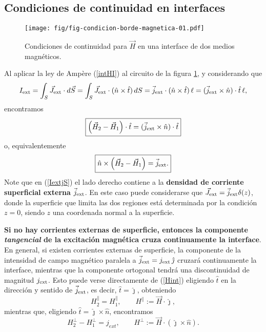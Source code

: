 \subsection{Condiciones de continuidad en interfaces}
\begin{figure}[!h]
\centerline{\texttt{[image: fig/fig-condicion-borde-magnetica-01.pdf]}}
\caption{Condiciones de continuidad para $\vec{H}$ en una interface de dos
medios magnéticos.}
\label{BM1}
\end{figure}
Al aplicar la ley de Amp\`ere (\ref{intHI}) al circuito de la figura \ref{BM1},
y considerando que
\begin{equation}\label{IextjS}
 I_{\rm ext}=\int_S\vec{J}_{\rm ext}\cdot d\vec{S}=\int_S\vec{J}_{\rm ext}\cdot
(\hat{n}\times\hat{t})\,dS=\vec{j}_{\rm ext}\cdot
(\hat{n}\times\hat{t})\,\ell=(\vec{j}_{\rm ext}\times\hat{n})\cdot\hat{t}\,\ell ,
\end{equation}
encontramos
\begin{equation}
 \boxed{\left(\vec{H}_2-\vec{H}_1\right)\cdot\hat{t}=(\vec{j}_{\rm
ext}\times\hat{n})\cdot\hat{t}} \label{Hint}
\end{equation}
o, equivalentemente
\begin{equation}
\boxed{\hat{n}\times\left(\vec{H}_2-\vec{H}_1\right)=\vec{j}_{\rm
ext}.}
\end{equation}
Note que en (\ref{IextjS}) el lado derecho contiene a la \textbf{densidad de corriente superficial externa} $\vec{j}_{\rm ext}$. En este caso puede considerarse que $\vec{J}_{\rm ext}=\vec{j}_{\rm ext}\delta(z)$, donde la superficie que limita las dos regiones está determinada por la condición $z=0$, siendo $z$ una coordenada normal a la superficie.

\textbf{Si no hay corrientes externas de superficie, entonces la componente \textit{tangencial} de la excitación magnética cruza continuamente la interface}. En general, si
existen corrientes externas de superficie, la componente de la intensidad de
campo magnético paralela a $\vec{j}_{\rm ext}=j_{\rm ext}\,\hat{\jmath}$ cruzará continuamente la interface, mientras que la componente ortogonal tendrá una discontinuidad de magnitud $j_{\rm ext}$. Esto puede verse directamente
de (\ref{Hint}) eligiendo $\hat{t}$ en la dirección y sentido de
$\vec{j}_{\rm ext}$, es decir, $\hat{t}=\hat{\jmath}$, obteniendo
\begin{equation}
 H_2^\parallel=H_1^\parallel,  \qquad H^\parallel:=\vec{H}\cdot\hat{\jmath},
\end{equation}
mientras que, eligiendo $\hat{t}=\hat{\jmath}\times\hat{n}$, encontramos
\begin{equation}
 H_2^\perp-H_1^\perp=j_{ext},  \qquad
H^\perp:=\vec{H}\cdot(\hat{\jmath}\times\hat{n}).
\end{equation}

